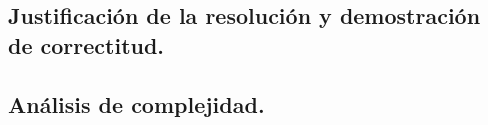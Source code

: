 
\vspace*{0.6cm}

\subsection{Justificación de la resolución y demostración de correctitud.}

\vspace*{0.3cm}


\vspace*{0.6cm}

\subsection{Análisis de complejidad.}

\vspace*{0.3cm}


